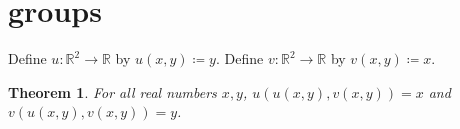 \documentclass{article}
\newtheorem{theorem}{Theorem}
\begin{document}
\section{groups}
Define $u:\mathbb{R}^2\to\mathbb{R}$ by $u(x,y)\coloneqq y$.
Define $v:\mathbb{R}^2\to\mathbb{R}$ by $v(x,y)\coloneqq x$.
\begin{theorem}\label{thm:RG01}
For all real numbers $x,y$, $u(u(x,y),v(x,y))=x$ and $v(u(x,y),v(x,y))=y$.
\end{theorem}
\end{document}
